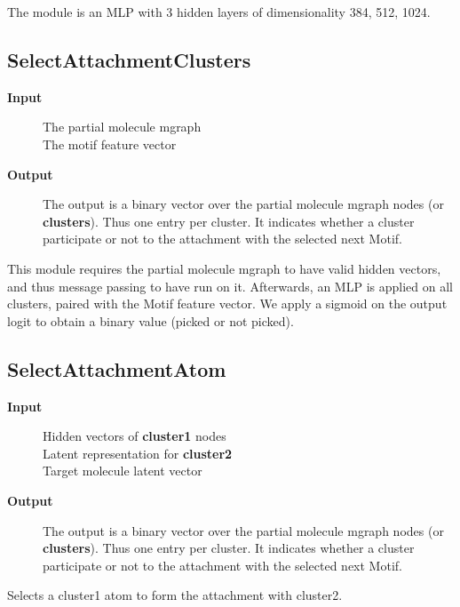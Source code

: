 \documentclass{article}
\begin{document}
The module is an MLP with 3 hidden layers of dimensionality 384, 512, 1024.


\subsection{SelectAttachmentClusters}

\begin{description}
\item[\textbf{Input}]
    The partial molecule mgraph\\
    The motif feature vector
\item[\textbf{Output}]
    The output is a binary vector over the partial molecule mgraph nodes (or \textbf{clusters}).
    Thus one entry per cluster. It indicates whether a cluster participate or not to the attachment with
    the selected next Motif.
\end{description}

This module requires the partial molecule mgraph to have valid hidden vectors, and thus message passing to have run on it.
Afterwards, an MLP is applied on all clusters, paired with the Motif feature vector.
We apply a sigmoid on the output logit to obtain a binary value (picked or not picked).


\subsection{SelectAttachmentAtom}

\begin{description}
\item[\textbf{Input}]
    Hidden vectors of \textbf{cluster1} nodes\\
    Latent representation for \textbf{cluster2}\\
    Target molecule latent vector
\item[\textbf{Output}]
    The output is a binary vector over the partial molecule mgraph nodes (or \textbf{clusters}).
    Thus one entry per cluster. It indicates whether a cluster participate or not to the attachment with
    the selected next Motif.
\end{description}

Selects a cluster1 atom to form the attachment with cluster2.
\end{document}
